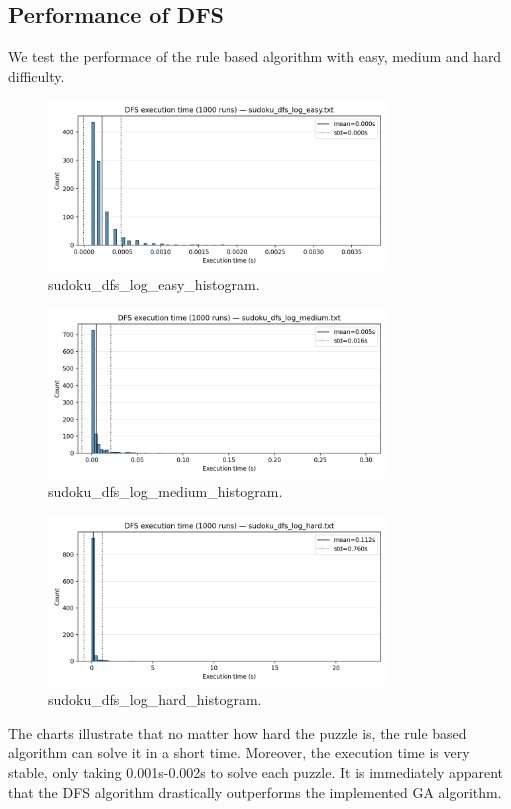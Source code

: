 \subsection{Performance of DFS}

We test the performace of the rule based algorithm with easy, medium and hard difficulty.

\begin{figure}[H]
\centering
\includegraphics[width=0.8\textwidth]{resources/sudoku_dfs_log_easy_histogram.png}
\caption{sudoku\_dfs\_log\_easy\_histogram.}
\label{fig:sudoku_dfs_log_easy_histogram}
\end{figure}

\begin{figure}[H]
\centering
\includegraphics[width=0.8\textwidth]{resources/sudoku_dfs_log_medium_histogram.png}
\caption{sudoku\_dfs\_log\_medium\_histogram.}
\label{fig:sudoku_dfs_log_medium_histogram}
\end{figure}

\begin{figure}[H]
\centering
\includegraphics[width=0.8\textwidth]{resources/sudoku_dfs_log_hard_histogram.png}
\caption{sudoku\_dfs\_log\_hard\_histogram.}
\label{fig:sudoku_dfs_log_hard_histogram}
\end{figure}

The charts illustrate that no matter how hard the puzzle is, the rule based algorithm can solve it in a short time. Moreover, the execution time is very stable, only taking 0.001s-0.002s to solve each puzzle. It is immediately apparent that the DFS algorithm drastically outperforms the implemented GA algorithm.
